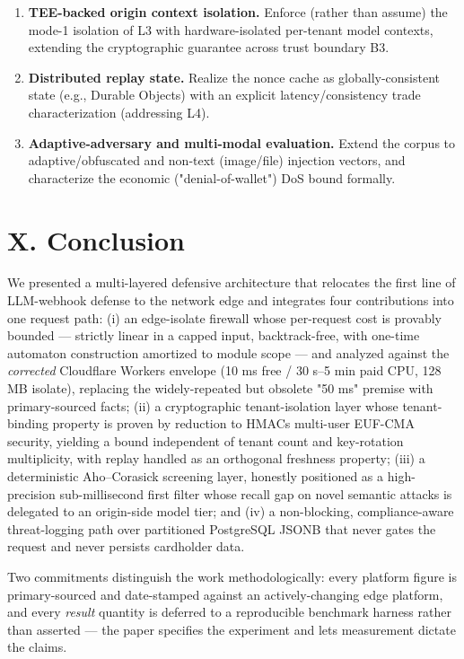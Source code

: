 \begin{enumerate}
  signatures to obtain forward secrecy and reduce key-distribution
  burden (addressing L2), quantifying the added edge CPU cost of
  asymmetric verification against the §III budget.
\item
  \textbf{TEE-backed origin context isolation.} Enforce (rather than
  assume) the mode-1 isolation of L3 with hardware-isolated per-tenant
  model contexts, extending the cryptographic guarantee across trust
  boundary B3.
\item
  \textbf{Distributed replay state.} Realize the nonce cache as
  globally-consistent state (e.g., Durable Objects) with an explicit
  latency/consistency trade characterization (addressing L4).
\item
  \textbf{Adaptive-adversary and multi-modal evaluation.} Extend the
  corpus to adaptive/obfuscated and non-text (image/file) injection
  vectors, and characterize the economic ("denial-of-wallet") DoS bound
  formally.
\end{enumerate}

\section{X. Conclusion}\label{x-conclusion}

We presented a multi-layered defensive architecture that relocates the
first line of LLM-webhook defense to the network edge and integrates
four contributions into one request path: (i) an edge-isolate firewall
whose per-request cost is provably bounded --- strictly linear in a
capped input, backtrack-free, with one-time automaton construction
amortized to module scope --- and analyzed against the \emph{corrected}
Cloudflare Workers envelope (10 ms free / 30 s--5 min paid CPU, 128 MB
isolate), replacing the widely-repeated but obsolete "50 ms" premise
with primary-sourced facts; (ii) a cryptographic tenant-isolation layer
whose tenant-binding property is proven by reduction to
HMAC\textquotesingle s multi-user EUF-CMA security, yielding a bound
independent of tenant count and key-rotation multiplicity, with replay
handled as an orthogonal freshness property; (iii) a deterministic
Aho--Corasick screening layer, honestly positioned as a high-precision
sub-millisecond first filter whose recall gap on novel semantic attacks
is delegated to an origin-side model tier; and (iv) a non-blocking,
compliance-aware threat-logging path over partitioned PostgreSQL JSONB
that never gates the request and never persists cardholder data.

Two commitments distinguish the work methodologically: every platform
figure is primary-sourced and date-stamped against an actively-changing
edge platform, and every \emph{result} quantity is deferred to a
reproducible benchmark harness rather than asserted --- the paper
specifies the experiment and lets measurement dictate the claims.

